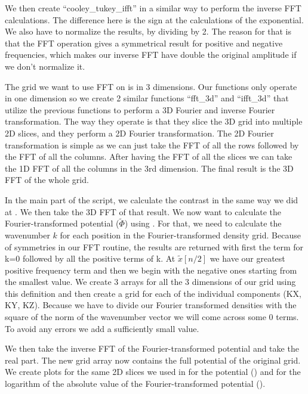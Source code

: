 \documentclass[a4paper,10pt]{article}
\begin{document}
We then create ``cooley\_tukey\_ifft'' in a similar way to perform the inverse FFT calculations. The difference here is the sign at the calculations of the exponential. We also have to normalize the results, by dividing by 2. The reason for that is that the FFT operation gives a symmetrical result for positive and negative frequencies, which makes our inverse FFT have double the original amplitude if we don't normalize it.

The grid we want to use FFT on is in 3 dimensions. Our functions only operate in one dimension so we create 2 similar functions ``fft\_3d'' and ``ifft\_3d'' that utilize the previous functions to perform a 3D Fourier and inverse Fourier transformation. The way they operate is that they slice the 3D grid into multiple 2D slices, and they perform a 2D Fourier transformation. The 2D Fourier transformation is simple as we can just take the FFT of all the rows followed by the FFT of all the columns. After having the FFT of all the slices we can take the 1D FFT of all the columns in the 3rd dimension. The final result is the 3D FFT of the whole grid. 



In the main part of the script, we calculate the contrast in the same way we did at . We then take the 3D FFT of that result. We now want to calculate the Fourier-transformed potential ($\tilde{\Phi}$) using . For that, we need to calculate the wavenumber $k$ for each position in the Fourier-transformed density grid. Because of symmetries in our FFT routine, the results are returned with first the term for k=0 followed by all the positive terms of k. At $\tilde{x}[n/2]$ we have our greatest positive frequency term and then we begin with the negative ones starting from the smallest value. We create 3 arrays for all the 3 dimensions of our grid using this definition and then create a grid for each of the individual components (KX, KY, KZ). Because we have to divide our Fourier transformed densities with the square of the norm of the wavenumber vector we will come across some 0 terms. To avoid any errors we add a sufficiently small value. 

We then take the inverse FFT of the Fourier-transformed potential and take the real part. The new grid array now contains the full potential of the original grid. We create plots for the same 2D slices we used in  for the potential () and for the logarithm of the absolute value of the Fourier-transformed potential (). 
\end{document}
